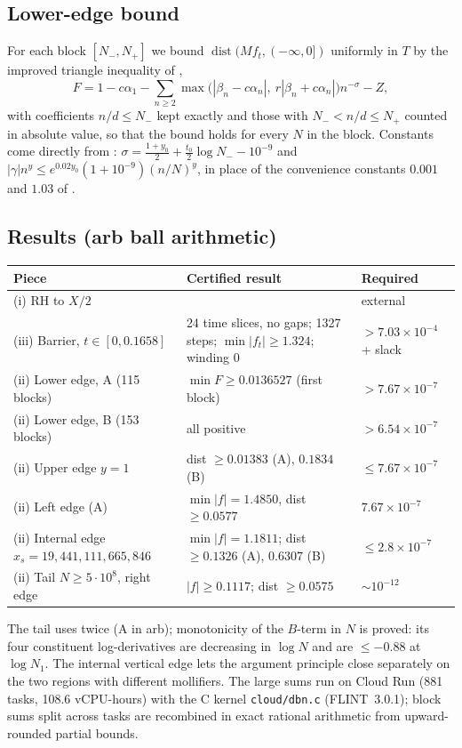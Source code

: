 \documentclass[11pt]{amsart}
\begin{document}
\subsection*{Lower-edge bound}
For each block $[N_-,N_+]$ we bound $\operatorname{dist}(Mf_t,(-\infty,0])$ uniformly in $T$ by the improved triangle
inequality of \cite[\S8]{pm15},
\[F=1-c\alpha_1-\sum_{n\ge2}\max\bigl(|\beta_n-c\alpha_n|,\ r|\beta_n+c\alpha_n|\bigr)n^{-\sigma}-Z,\]
with coefficients $n/d\le N_-$ kept exactly and those with $N_-<n/d\le N_+$ counted in absolute value, so that the bound
holds for every $N$ in the block. Constants come directly from \cite[Thm.~1.3, (20)--(21)]{pm15}:
$\sigma=\frac{1+y_0}2+\frac{t_0}2\log N_--10^{-9}$ and $|\gamma|n^{y}\le e^{0.02y_0}(1+10^{-9})(n/N)^{y}$, in place of
the convenience constants $0.001$ and $1.03$ of \cite[\S8]{pm15}.

\subsection*{Results (arb ball arithmetic)}
\begin{center}
\begin{tabular}{p{5.2cm}p{6.6cm}p{2.8cm}}
\toprule
Piece & Certified result & Required \\ \midrule
(i) RH to $X/2$ & \cite{pt} & external \\
(iii) Barrier, $t\in[0,0.1658]$ & 24 time slices, no gaps; 1327 steps; $\min|f_t|\ge1.324$; winding $0$ & $>7.03\times10^{-4}$ + slack \\
(ii) Lower edge, A (115 blocks) & $\min F\ge0.0136527$ (first block) & $>7.67\times10^{-7}$ \\
(ii) Lower edge, B (153 blocks) & all positive & $>6.54\times10^{-7}$ \\
(ii) Upper edge $y=1$ & dist $\ge0.01383$ (A), $0.1834$ (B) & $\le7.67\times10^{-7}$ \\
(ii) Left edge (A) & $\min|f|=1.4850$, dist $\ge0.0577$ & $7.67\times10^{-7}$ \\
(ii) Internal edge $x_s=19{,}441{,}111{,}665{,}846$ & $\min|f|=1.1811$; dist $\ge0.1326$ (A), $0.6307$ (B) & $\le2.8\times10^{-7}$ \\
(ii) Tail $N\ge5\cdot10^8$, right edge & $|f|\ge0.1117$; dist $\ge0.0575$ & $\sim10^{-12}$ \\
\bottomrule
\end{tabular}
\end{center}
The tail uses \cite[Lemma ``largen'']{pm15} twice (A in arb); monotonicity of the $B$-term in $N$ is proved: its four
constituent log-derivatives are decreasing in $\log N$ and are $\le-0.88$ at $\log N_1$. The internal vertical edge lets
the argument principle close separately on the two regions with different mollifiers. The large sums run on Cloud Run
(881 tasks, 108.6 vCPU-hours) with the C kernel \texttt{cloud/dbn.c} (FLINT~3.0.1); block sums split across tasks are
recombined in exact rational arithmetic from upward-rounded partial bounds.
\end{document}
